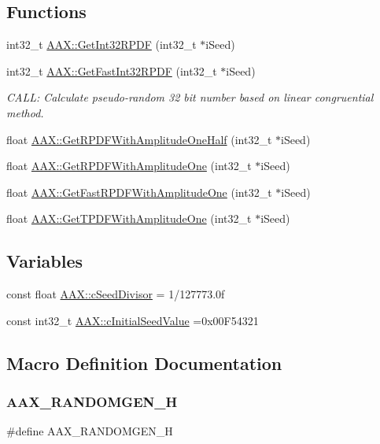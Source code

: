 \subsection*{Functions}
\begin{DoxyCompactItemize}
\item 
int32\+\_\+t \mbox{\hyperlink{a00852_af3435129d3c94c5f3d5e671943b9bbe2}{A\+A\+X\+::\+Get\+Int32\+R\+P\+DF}} (int32\+\_\+t $\ast$i\+Seed)
\item 
int32\+\_\+t \mbox{\hyperlink{a00852_ad12251899137d551b9f652b1ffee2f99}{A\+A\+X\+::\+Get\+Fast\+Int32\+R\+P\+DF}} (int32\+\_\+t $\ast$i\+Seed)
\begin{DoxyCompactList}\small\item\em C\+A\+LL\+: Calculate pseudo-\/random 32 bit number based on linear congruential method. \end{DoxyCompactList}\item 
float \mbox{\hyperlink{a00852_a5a91375167236862abc93ad879639cab}{A\+A\+X\+::\+Get\+R\+P\+D\+F\+With\+Amplitude\+One\+Half}} (int32\+\_\+t $\ast$i\+Seed)
\item 
float \mbox{\hyperlink{a00852_a51d7a263d9053276c6cef1dbd2018ebe}{A\+A\+X\+::\+Get\+R\+P\+D\+F\+With\+Amplitude\+One}} (int32\+\_\+t $\ast$i\+Seed)
\item 
float \mbox{\hyperlink{a00852_a145cc6d06cd682e2d234d07ce939760e}{A\+A\+X\+::\+Get\+Fast\+R\+P\+D\+F\+With\+Amplitude\+One}} (int32\+\_\+t $\ast$i\+Seed)
\item 
float \mbox{\hyperlink{a00852_a42cc414ea1b868e26c591041a66ad8af}{A\+A\+X\+::\+Get\+T\+P\+D\+F\+With\+Amplitude\+One}} (int32\+\_\+t $\ast$i\+Seed)
\end{DoxyCompactItemize}
\subsection*{Variables}
\begin{DoxyCompactItemize}
\item 
const float \mbox{\hyperlink{a00852_a0c975151f0d47cc80eef9ff5a7c80125}{A\+A\+X\+::c\+Seed\+Divisor}} = 1/127773.\+0f
\item 
const int32\+\_\+t \mbox{\hyperlink{a00852_a143d659ccb62ae0807e9902e751b14cf}{A\+A\+X\+::c\+Initial\+Seed\+Value}} =0x00\+F54321
\end{DoxyCompactItemize}


\subsection{Macro Definition Documentation}
\mbox{\label{a00779_a037b85bd9c13c42dee11b4016fa2d90a}} 
\subsubsection{\texorpdfstring{AAX\_RANDOMGEN\_H}{AAX\_RANDOMGEN\_H}}
{\footnotesize\ttfamily \#define A\+A\+X\+\_\+\+R\+A\+N\+D\+O\+M\+G\+E\+N\+\_\+H}

